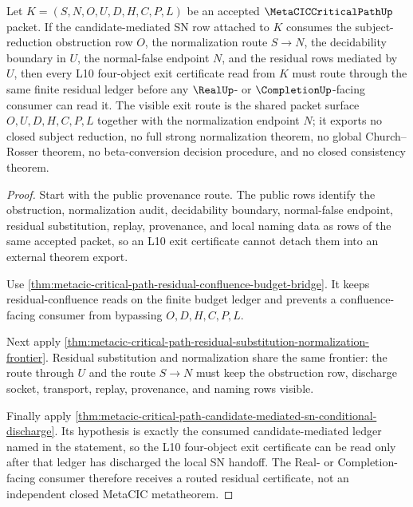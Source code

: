 \begin{theorem}
\label{thm:metacic-critical-path-l10-residual-route}
Let $K=(S,N,O,U,D,H,C,P,L)$ be an accepted $\MetaCICCriticalPathUp$ packet. If the candidate-mediated SN row attached to $K$ consumes the subject-reduction obstruction row $O$, the normalization route $S \to N$, the decidability boundary in $U$, the normal-false endpoint $N$, and the residual rows mediated by $U$, then every L10 four-object exit certificate read from $K$ must route through the same finite residual ledger before any $\RealUp$- or $\CompletionUp$-facing consumer can read it. The visible exit route is the shared packet surface $O,U,D,H,C,P,L$ together with the normalization endpoint $N$; it exports no closed subject reduction, no full strong normalization theorem, no global Church--Rosser theorem, no beta-conversion decision procedure, and no closed consistency theorem.
\end{theorem}
\begin{proof}
Start with the public provenance route. The public rows identify the obstruction, normalization audit, decidability boundary, normal-false endpoint, residual substitution, replay, provenance, and local naming data as rows of the same accepted packet, so an L10 exit certificate cannot detach them into an external theorem export.

Use \autoref{thm:metacic-critical-path-residual-confluence-budget-bridge}. It keeps residual-confluence reads on the finite budget ledger and prevents a confluence-facing consumer from bypassing $O,D,H,C,P,L$.

Next apply \autoref{thm:metacic-critical-path-residual-substitution-normalization-frontier}. Residual substitution and normalization share the same frontier: the route through $U$ and the route $S \to N$ must keep the obstruction row, discharge socket, transport, replay, provenance, and naming rows visible.

Finally apply \autoref{thm:metacic-critical-path-candidate-mediated-sn-conditional-discharge}. Its hypothesis is exactly the consumed candidate-mediated ledger named in the statement, so the L10 four-object exit certificate can be read only after that ledger has discharged the local SN handoff. The Real- or Completion-facing consumer therefore receives a routed residual certificate, not an independent closed MetaCIC metatheorem.
\end{proof}

